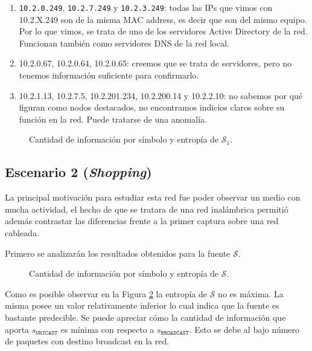 \begin{enumerate}
 \item \texttt{10.2.0.249}, \texttt{10.2.7.249} y \texttt{10.2.3.249}: todas las IPs que vimos con 10.2.X.249 son de la misma MAC address, es decir que son del mismo equipo. Por lo que vimos, se trata de uno de los servidores Active Directory de la red. Funcionan también como servidores DNS de la red local.
 \item 10.2.0.67, 10.2.0.64, 10.2.0.65: creemos que se trata de servidores, pero no tenemos información suficiente para confirmarlo.
 \item 10.2.1.13, 10.2.7.5, 10.2.201.234, 10.2.200.14 y 10.2.2.10: no sabemos por qué figuran como nodos destacados, no encontramos indicios claros sobre su función en la red. Puede tratarse de una anomalía.
\end{enumerate}

\begin{figure}[h]
	\caption{Cantidad de información por símbolo y entropía de $\mathcal{S}_1$.}
    \label{res:esc1:fig3}
\end{figure}




\subsection{Escenario 2 (\emph{Shopping})}

La principal motivación para estudiar esta red fue poder observar un medio con
mucha actividad, el hecho de que se tratara de una red inalámbrica permitió además
contrastar las diferencias frente a la primer captura sobre una red cableada.

Primero se analizarán los resultados obtenidos para la fuente $\mathcal{S}$.

\begin{figure}[h]
	\caption{Cantidad de información por símbolo y entropía de $\mathcal{S}$.}
    \label{res:esc2:fig1}
\end{figure}


Como es posible observar en la Figura \ref{res:esc2:fig1} la entropía de
$\mathcal{S}$ no es máxima. La misma posee un valor relativamente inferior lo
cual indica que la fuente es bastante predecible. Se puede apreciar cómo la
cantidad de información que aporta $s_{\texttt{UNICAST}}$ es mínima con respecto
a $s_{\texttt{BROADCAST}}$. Esto se debe al bajo número de paquetes con destino
broadcast en la red.


